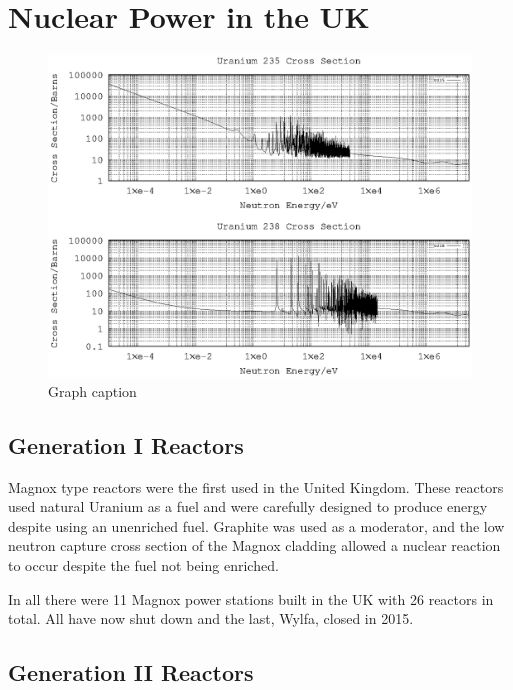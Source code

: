 \section{Nuclear Power in the UK}


\begin{figure}[htbp]
  \begin{center}
    \includegraphics{chapters/introduction/plots/uranium_cross_section/u_xs}%
    \caption{Graph caption}
    \label{graph:graph1}
  \end{center}
\end{figure}




\subsection{Generation I Reactors}

Magnox type reactors were the first used in the United Kingdom.  These reactors used natural Uranium as a fuel and were carefully designed to produce energy despite using an unenriched fuel.  Graphite was used as a moderator, and the low neutron capture cross section of the Magnox cladding allowed a nuclear reaction to occur despite the fuel not being enriched.

In all there were 11 Magnox power stations built in the UK with 26 reactors in total.  All have now shut down and the last, Wylfa, closed in 2015.


\subsection{Generation II Reactors}

